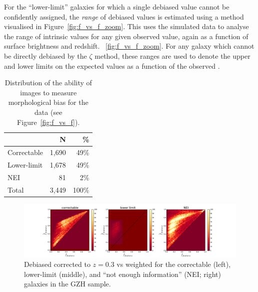 \documentclass[a4paper,fleqn,usenatbib]{mnras}
\begin{document}
For the ``lower-limit'' galaxies for which a single debiased \ffeatures{} value
cannot be confidently assigned, the \emph{range} of debiased values is
estimated using a method visualised in Figure~\ref{fig:f_vs_f_zoom}. This uses the
\ferengi{} simulated data to analyse the range of intrinsic \ffeaturesrest{}
values for any given observed \ffeatures{} value, again as a function of
surface brightness and redshift. ~\ref{fig:f_vs_f_zoom}. For any galaxy which
cannot be directly debiased by the $\zeta$ method, these ranges are used to
denote the upper and lower limits on the expected values \ffeaturesrest{} as a
function of the observed \ffeatures. 

\begin{table}
\center
\caption{Distribution of the ability of images to measure
morphological bias for
the \ferengi{} data (see Figure~\ref{fig:f_vs_f}).}
\label{tbl:ferengi_corrections}
\begin{tabular}{lrr}
\hline \hline
                                   & N       & \% \\
\hline 
Correctable                        & 1,690   &  49\% \\
Lower-limit                        & 1,678   &  49\% \\
NEI                                & 81      &   2\%\\
Total                              & 3,449   & 100\% \\
\hline \hline
\end{tabular}
\end{table}

\begin{figure}
\center
\includegraphics[width=\textwidth]{figures/debiased_corrections.pdf}
\caption{Debiased \ffeatures{} corrected to $z=0.3$ vs weighted \ffeatures{}
for the correctable (left), lower-limit (middle), and ``not enough
information'' (NEI; right) galaxies in the GZH sample.}
\label{fig:debiased_corrections}
\end{figure}
\end{document}
